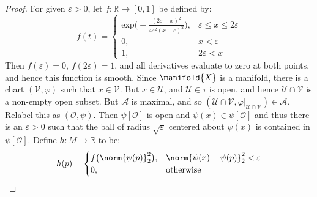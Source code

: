 \documentclass{article}                                                        %
\begin{document}
            \begin{proof}
                For given $\varepsilon>0$, let $f:\mathbb{R}\rightarrow[0,1]$ be
                defined by:
                \begin{equation}
                    f(t)=\begin{cases}
                        \textrm{exp}\Big(
                            \minus\frac{(2\varepsilon-x)^{2}}
                                {4\varepsilon^{2}(x-\varepsilon)^{2}}
                            \Big),&\varepsilon\leq{x}\leq{2}\varepsilon\\
                            0,&x<\varepsilon\\
                            1,&2\varepsilon<x
                    \end{cases}
                \end{equation}
                Then $f(\varepsilon)=0$, $f(2\varepsilon)=1$, and all
                derivatives evaluate to zero at both points, and hence this
                function is smooth. Since $\manifold{X}$ is a manifold, there is
                a chart $(\mathcal{V},\varphi)$ such that $x\in\mathcal{V}$.
                But $x\in\mathcal{U}$, and $\mathcal{U}\in\tau$ is open, and
                hence $\mathcal{U}\cap\mathcal{V}$ is a non-empty open subset.
                But $\mathcal{A}$ is maximal, and so
                $(\mathcal{U}\cap\mathcal{V},%
                 \varphi|_{\mathcal{U}\cap\mathcal{V}})\in\mathcal{A}$.
                Relabel this as $(\mathcal{O},\psi)$. Then
                $\psi[\mathcal{O}]$ is open and $\psi(x)\in\psi[\mathcal{O}]$
                and thus there is an $\varepsilon>0$ such that the ball of
                radius $\sqrt{\varepsilon}$ centered about $\psi(x)$ is
                contained in $\psi[\mathcal{O}]$. Define
                $h:M\rightarrow\mathbb{R}$ to be:
                \begin{equation}
                    h(p)=
                    \begin{cases}
                        f\big(\norm{\psi(p)}_{2}^{2}\big),
                            &\norm{\psi(x)-\psi(p)}_{2}^{2}<\varepsilon\\
                        0,&\textrm{otherwise}
                    \end{cases}
                \end{equation}
            \end{proof}
\end{document}
